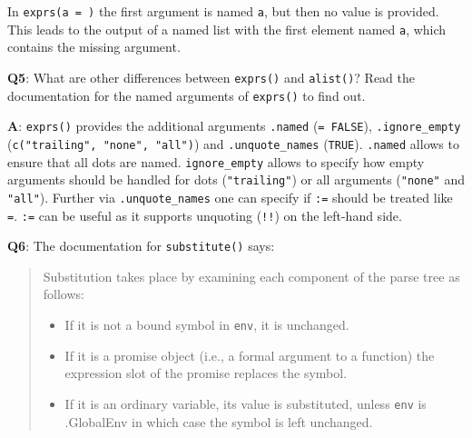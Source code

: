 \documentclass[
]{krantz}
\makeatletter
\newenvironment{Shaded}{\begin{snugshade}}{\end{snugshade}}
\newcommand{\CommentTok}[1]{\textcolor[rgb]{0.56,0.35,0.01}{\textit{#1}}}
\newcommand{\DataTypeTok}[1]{\textcolor[rgb]{0.13,0.29,0.53}{#1}}
\newcommand{\KeywordTok}[1]{\textcolor[rgb]{0.13,0.29,0.53}{\textbf{#1}}}
\newcommand{\NormalTok}[1]{#1}
\newcommand{\OperatorTok}[1]{\textcolor[rgb]{0.81,0.36,0.00}{\textbf{#1}}}
\newcommand{\StringTok}[1]{\textcolor[rgb]{0.31,0.60,0.02}{#1}}
\providecommand{\tightlist}{%
  \setlength{\itemsep}{0pt}\setlength{\parskip}{0pt}}
\newenvironment{kframe}{%
\medskip{}
\setlength{\fboxsep}{.8em}
 \def\at@end@of@kframe{}%
 \ifinner\ifhmode%
  \def\at@end@of@kframe{\end{minipage}}%
  \begin{minipage}{\columnwidth}%
 \fi\fi%
 \def\FrameCommand##1{\hskip\@totalleftmargin \hskip-\fboxsep
 \colorbox{shadecolor}{##1}\hskip-\fboxsep
     \hskip-\linewidth \hskip-\@totalleftmargin \hskip\columnwidth}%
 \MakeFramed {\advance\hsize-\width
   \@totalleftmargin\z@ \linewidth\hsize
   \@setminipage}}%
 {\par\unskip\endMakeFramed%
 \at@end@of@kframe}
\renewenvironment{Shaded}{\begin{kframe}}{\end{kframe}}
\renewcommand{\KeywordTok} [1]{\textcolor[rgb]{0.00,0.44,0.13}{{#1}}}
\renewcommand{\DataTypeTok}[1]{\textcolor[rgb]{0.56,0.13,0.00}{{#1}}}
\renewcommand{\StringTok}  [1]{\textcolor[rgb]{0.25,0.44,0.63}{{#1}}}
\renewcommand{\CommentTok} [1]{\textcolor[rgb]{0.38,0.63,0.69}{{#1}}}
\renewcommand{\NormalTok}  [1]{{#1}}
\makeatother
\begin{document}
In \texttt{exprs(a\ =\ )} the first argument is named \texttt{a}, but then no value is provided. This leads to the output of a named list with the first element named \texttt{a}, which contains the missing argument.

\begin{Shaded}
\end{Shaded}

\textbf{{Q5}}: What are other differences between \texttt{exprs()} and \texttt{alist()}? Read the documentation for the named arguments of \texttt{exprs()} to find out.

\textbf{{A}}: \texttt{exprs()} provides the additional arguments \texttt{.named} (\texttt{=\ FALSE}), \texttt{.ignore\_empty} (\texttt{c("trailing",\ "none",\ "all")}) and \texttt{.unquote\_names} (\texttt{TRUE}). \texttt{.named} allows to ensure that all dots are named. \texttt{ignore\_empty} allows to specify how empty arguments should be handled for dots (\texttt{"trailing"}) or all arguments (\texttt{"none"} and \texttt{"all"}). Further via \texttt{.unquote\_names} one can specify if \texttt{:=} should be treated like \texttt{=}. \texttt{:=} can be useful as it supports unquoting (\texttt{!!}) on the left-hand side.

\textbf{{Q6}}: The documentation for \texttt{substitute()} says:

\begin{quote}
Substitution takes place by examining each component of the parse tree
as follows:

\begin{itemize}
\tightlist
\item
  If it is not a bound symbol in \texttt{env}, it is unchanged.
\item
  If it is a promise object (i.e., a formal argument to a function) the expression slot of the promise replaces the symbol.
\item
  If it is an ordinary variable, its value is substituted, unless \texttt{env} is .GlobalEnv in which case the symbol is left unchanged.
\end{itemize}
\end{quote}
\end{document}

